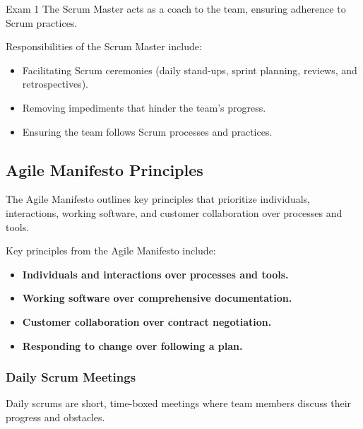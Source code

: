 \begin{examnotes}{Exam 1}
    The Scrum Master acts as a coach to the team, ensuring adherence to Scrum practices.
    
    \begin{highlight}
        Responsibilities of the Scrum Master include:
        
        \begin{itemize}
            \item Facilitating Scrum ceremonies (daily stand-ups, sprint planning, reviews, and retrospectives).
            \item Removing impediments that hinder the team's progress.
            \item Ensuring the team follows Scrum processes and practices.
        \end{itemize}
    \end{highlight}
    
    \subsection*{Agile Manifesto Principles}
    
    The Agile Manifesto outlines key principles that prioritize individuals, interactions, working software, and customer collaboration over processes and tools.
    
    \begin{highlight}
        Key principles from the Agile Manifesto include:
        
        \begin{itemize}
            \item \textbf{Individuals and interactions over processes and tools.}
            \item \textbf{Working software over comprehensive documentation.}
            \item \textbf{Customer collaboration over contract negotiation.}
            \item \textbf{Responding to change over following a plan.}
        \end{itemize}
    \end{highlight}
    
    \subsubsection*{Daily Scrum Meetings}
    
    Daily scrums are short, time-boxed meetings where team members discuss their progress and obstacles.
    

\end{examnotes}
